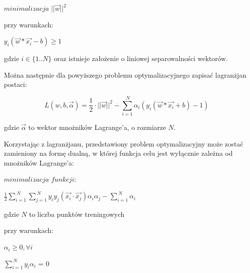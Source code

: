 \documentclass[[10pt,a4paper]{article}
\begin{document}
\vspace{5mm}\centerline {$minimalizacja$  $||\overrightarrow{w}||^2$}

\vspace{5mm} przy warunkach:

\vspace{5mm}\centerline {$y_i(\overrightarrow{w}*\overrightarrow{x_i} - b)\geq 1$}

\vspace{5mm}gdzie $i \in \{1..N\}$ oraz istnieje założenie o liniowej separowalności wektorów.

\vspace{5mm}Można następnie dla powyższego problemu optymalizacyjnego zapisać lagranżjan postaci:

\vspace{5mm}
\begin{equation}
L(w,b,\overrightarrow{\alpha}) = \frac{1}{2}\cdot||\overrightarrow{w}||^2 - \sum_{i=1}^{\ N} \alpha_i(y_i(\overrightarrow{w}* \overrightarrow{x_i} +b)-1) 
\end{equation} 

\vspace{5mm} gdzie $\overrightarrow{\alpha}$ to wektor mnożników Lagrange'a, o rozmiarze $N$.

\vspace{5mm} Korzystając z lagranżjanu, przedstawiony problem optymalizacyjny może zostać zamieniony na formę dualną, w której funkcja celu jest wyłącznie zależna od mnożników Lagrange'a:

\vspace{5mm}\centerline {$minimalizacja$  $funkcji:$}

\vspace{5mm}\centerline {$\frac{1}{2} \sum_{i=1}^{\ N} \sum_{j=1}^{\ N} y_i y_j (\overrightarrow{x_i}\cdot\overrightarrow{x_j}) \alpha_i \alpha_j - \sum_{i=1}^{\ N} \alpha_i$}
  
\vspace{5mm} gdzie $N$ to liczba punktów treningowych

\vspace{5mm} przy warunkach:

\vspace{5mm}\centerline {$\alpha_i \geq 0, \forall i$ }

\vspace{5mm}\centerline {$\sum_{i=1}^{\ N} y_i \alpha_i$ = 0 }

\vspace{5mm}
\end{document}
